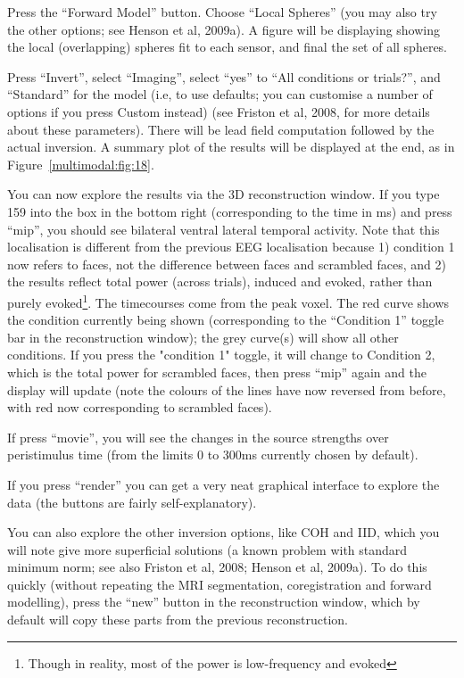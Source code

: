 Press the ``Forward Model'' button. Choose ``Local Spheres'' (you may also try the other options; see Henson et al, 2009a). A figure will be displaying showing the local (overlapping) spheres fit to each sensor, and final the set of all spheres.

Press ``Invert'', select ``Imaging'', select ``yes'' to ``All conditions or trials?'', and ``Standard'' for the model (i.e, to use defaults; you can customise a number of options if you press Custom instead) (see Friston et al, 2008, for more details about these parameters). There will be lead field computation followed by the actual inversion. A summary plot of the results will be displayed at the end, as in Figure~\ref{multimodal:fig:18}.

You can now explore the results via the 3D reconstruction window. If you type 159 into the box in the bottom right (corresponding to the time in ms) and press ``mip'', you should see bilateral ventral lateral temporal activity. Note that this localisation is different from the previous EEG localisation because 1) condition 1 now refers to faces, not the difference between faces and scrambled faces, and 2) the results reflect total power (across trials), induced and evoked, rather than purely evoked\footnote{Though in reality, most of the power is low-frequency and evoked}. The timecourses come from the peak voxel. The red curve shows the condition currently being shown (corresponding to the ``Condition 1'' toggle bar in the reconstruction window); the grey curve(s) will show all other conditions. If you press the "condition 1" toggle, it will change to Condition 2, which is the total power for scrambled faces, then press ``mip'' again and the display will update (note the colours of the lines have now reversed from before, with red now corresponding to scrambled faces).

If press ``movie'', you will see the changes in the source strengths over peristimulus time (from the limits 0 to 300ms currently chosen by default).

If you press ``render'' you can get a very neat graphical interface to explore the data (the buttons are fairly self-explanatory). 

You can also explore the other inversion options, like COH and IID, which you will note give more superficial solutions (a known problem with standard minimum norm; see also Friston et al, 2008; Henson et al, 2009a). To do this quickly (without repeating the MRI segmentation, coregistration and forward modelling), press the ``new'' button in the reconstruction window, which by default will copy these parts from the previous reconstruction. 

